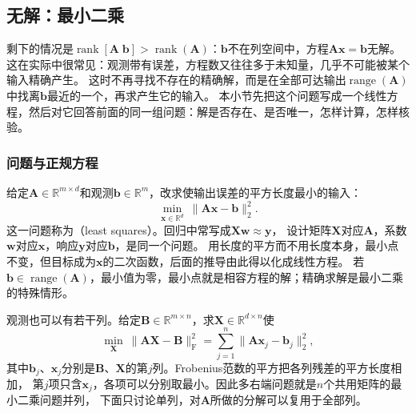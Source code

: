 
\subsection{无解：最小二乘}
\label{sec:ls-least-squares}
\label{sec:linear-algebra-residual-systems}
\label{sec:linear-algebra-projection-least-squares}
\label{sec:matrix-analysis-inverse-input-selection}

剩下的情况是$\operatorname{rank}[\bm A\;\bm b]>\operatorname{rank}(\bm A)$：$\bm b$不在列空间中，方程$\bm A\bm x=\bm b$无解。
这在实际中很常见：观测带有误差，方程数又往往多于未知量，几乎不可能被某个输入精确产生。
这时不再寻找不存在的精确解，而是在全部可达输出$\operatorname{range}(\bm A)$中找离$\bm b$最近的一个，再求产生它的输入。
本小节先把这个问题写成一个线性方程，然后对它回答前面的同一组问题：解是否存在、是否唯一，怎样计算，怎样核验。

\subsubsection{问题与正规方程}
\label{sec:ls-ordinary-ls}
\label{sec:ls-least-squares-objective}
\label{sec:ls-subspace-nearest-points}
\label{sec:linear-algebra-decomposition-projection}

给定$\bm A\in\mathbb R^{m\times d}$和观测$\bm b\in\mathbb R^m$，改求使输出误差的平方长度最小的输入：
\begin{equation}
 \min_{\bm x\in\mathbb R^d}\ \lVert\bm A\bm x-\bm b\rVert_2^2.
 \label{eq:linear-algebra-least-squares}
\end{equation}
这一问题称为（least squares）。回归中常写成$\bm X\bm w\approx\bm y$，
设计矩阵$\bm X$对应$\bm A$，系数$\bm w$对应$\bm x$，响应$\bm y$对应$\bm b$，是同一个问题。
用长度的平方而不用长度本身，最小点不变，但目标成为$\bm x$的二次函数，后面的推导由此得以化成线性方程。
若$\bm b\in\operatorname{range}(\bm A)$，最小值为零，最小点就是相容方程的解；精确求解是最小二乘的特殊情形。

观测也可以有若干列。给定$\bm B\in\mathbb R^{m\times n}$，求$\bm X\in\mathbb R^{d\times n}$使
\begin{equation}
 \min_{\bm X}\ \lVert\bm A\bm X-\bm B\rVert_{\mathrm F}^2
 =\sum_{j=1}^n\lVert\bm A\bm x_j-\bm b_j\rVert_2^2,
 \label{eq:ls-multi-right-frobenius}
\end{equation}
其中$\bm b_j$、$\bm x_j$分别是$\bm B$、$\bm X$的第$j$列。Frobenius范数的平方把各列残差的平方长度相加，
第$j$项只含$\bm x_j$，各项可以分别取最小。因此多右端问题就是$n$个共用矩阵的最小二乘问题并列，
下面只讨论单列，对$\bm A$所做的分解可以复用于全部列。

